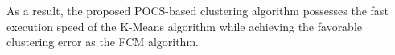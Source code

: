 \documentclass[conference]{IEEEtran}
\begin{document}
As a result, the proposed POCS-based clustering algorithm possesses the fast execution speed of the K-Means algorithm while achieving the favorable clustering error as the FCM algorithm.










\end{document}
